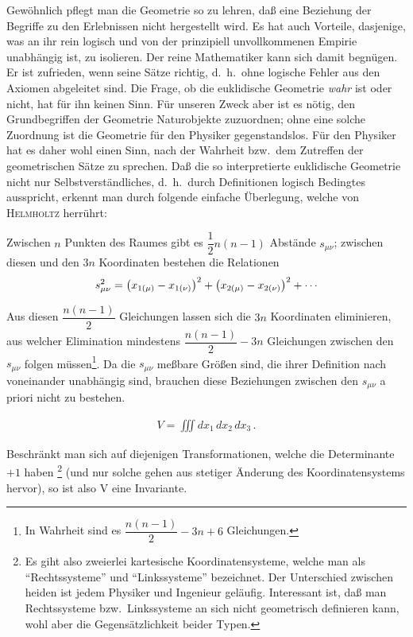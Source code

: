 Gewöhnlich pflegt man die Geometrie so zu lehren, daß eine Beziehung der 
Begriffe zu den Erlebnissen nicht hergestellt wird. Es hat auch Vorteile, 
dasjenige, was an ihr rein logisch und von der prinzipiell unvollkommenen 
Empirie unabhängig ist, zu isolieren. Der reine Mathematiker kann sich damit 
begnügen. Er ist zufrieden, wenn seine Sätze richtig, d.\ h.\ ohne logische
Fehler aus den Axiomen abgeleitet sind. Die Frage, ob die euklidische 
Geometrie \emph{wahr} ist oder nicht, hat für ihn keinen Sinn. Für unseren 
Zweck aber ist es nötig, den Grundbegriffen der Geometrie Naturobjekte 
zuzuordnen; ohne eine solche Zuordnung ist die Geometrie für den Physiker 
gegenstandslos. Für den Physiker hat es daher wohl einen Sinn, nach der 
Wahrheit bzw.\ dem Zutreffen der geometrischen Sätze zu sprechen. Daß die so 
interpretierte euklidische Geometrie nicht nur Selbstverständliches, d.\ h.\ 
durch Definitionen logisch Bedingtes ausspricht, erkennt man durch folgende 
einfache Überlegung, welche von \textsc{Helmholtz} herrührt:

Zwischen $n$ Punkten des Raumes gibt es $\dfrac{1}{2} n(n-1)$ Abstände 
$s_{\mu\nu}$; zwischen diesen und den $3n$ Koordinaten bestehen die Relationen
\begin{align}
s_{\mu\nu}^2 = {\left(x_{1(\mu)} - x_{1(\nu)}\right)}^2 +
	{\left(x_{2(\mu)} - x_{2(\nu)}\right)}^2 + \cdots
\end{align}

Aus diesen $\dfrac{n(n-1)}{2}$ Gleichungen lassen sich die $3n$ Koordinaten
eliminieren, aus welcher Elimination mindestens $\dfrac{n(n-1)}{2} - 3n$ 
Gleichungen zwischen den $s_{\mu\nu}$ folgen müssen\footnote{In Wahrheit sind 
es $\dfrac{n(n-1)}{2} - 3n + 6$ Gleichungen.}. Da die $s_{\mu\nu}$ meßbare 
Größen sind, die ihrer Definition nach voneinander unabhängig sind, brauchen 
diese Beziehungen zwischen den $s_{\mu\nu}$ a priori nicht zu bestehen.

\begin{align}
	V = \iiint d x_1\,d x_2\,d x_3\,.
\end{align}

Beschränkt man sich auf diejenigen Transformationen, welche die Determinante 
$+1$ haben \footnote{Es giht also zweierlei kartesische Koordinatensysteme,
welche man als \enquote{Rechtssysteme} und \enquote{Linkssysteme} bezeichnet. 
Der Unterschied zwischen heiden ist jedem Physiker und Ingenieur geläufig. 
Interessant ist, daß man Rechtssysteme bzw.\ Linkssysteme an sich nicht 
geometrisch definieren kann, wohl aber die Gegensätzlichkeit beider Typen.} (und 
nur solche gehen aus stetiger Änderung des Koordinatensystems hervor), so ist 
also V eine Invariante.

